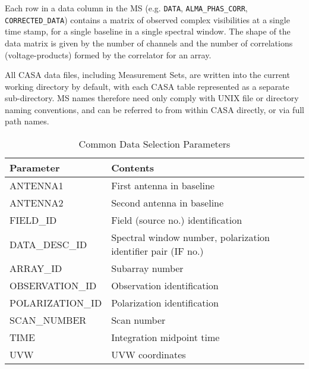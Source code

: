Each row in a data column in the MS (e.g. {\tt DATA}, {\tt ALMA\_PHAS\_CORR},
{\tt CORRECTED\_DATA}) contains a matrix of observed complex visibilities at
a single time stamp, for a single baseline in a single spectral
window.  The shape of the data matrix is given by the number of
channels and the number of correlations (voltage-products) formed by
the correlator for an array.  

All CASA data files, including Measurement Sets, are written into
the current working directory by default, with each CASA table
represented as a separate sub-directory.  MS names therefore need only
comply with UNIX file or directory naming conventions, and can be
referred to from within CASA directly, or via full path names.

\vspace{5mm}
\begin{table}[ht]
\caption[Common Data Selection Parameters]
        {\label{tabselect} Common Data Selection Parameters}
\begin{center}
\begin{tabular}{|ll|} \hline
{\bf Parameter}   &   {\bf Contents}                  \\
\hline
\hline
ANTENNA1      &   First antenna in baseline   \\
ANTENNA2      &   Second antenna in baseline  \\
FIELD\_ID      &   Field (source no.) identification  \\
DATA\_DESC\_ID  &   Spectral window number, polarization identifier pair (IF no.)  \\
ARRAY\_ID      &   Subarray number                \\
OBSERVATION\_ID  &   Observation identification   \\
POLARIZATION\_ID  &   Polarization identification \\ 
SCAN\_NUMBER   &   Scan number                    \\
TIME          &   Integration midpoint time      \\
UVW           &   UVW coordinates                \\
\hline
\end{tabular}
\end{center}
\end{table}

